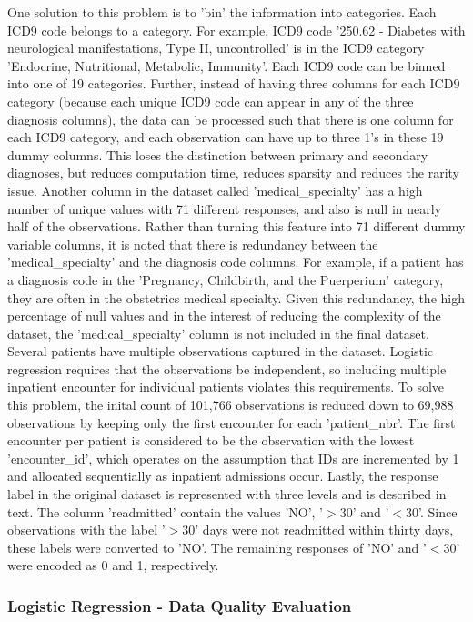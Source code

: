 \documentclass[sigconf]{acmart}
\begin{document}
One solution to this problem is to 'bin' the information into categories. Each ICD9 code belongs to a category. For example, ICD9 code '250.62 - Diabetes with neurological manifestations, Type II, uncontrolled' is in the ICD9 category 'Endocrine, Nutritional, Metabolic, Immunity'. Each ICD9 code can be binned into one of 19 categories. Further, instead of having three columns for each ICD9 category (because each unique ICD9 code can appear in any of the three diagnosis columns), the data can be processed such that there is one column for each ICD9 category, and each observation can have up to three 1's in these 19 dummy columns. This loses the distinction between primary and secondary diagnoses, but reduces computation time, reduces sparsity and reduces the rarity issue.
Another column in the dataset called 'medical\_specialty' has a high number of unique values with 71 different responses, and also is null in nearly half of the observations. Rather than turning this feature into 71 different dummy variable columns, it is noted that there is redundancy between the 'medical\_specialty' and the diagnosis code columns. For example, if a patient has a diagnosis code in the 'Pregnancy, Childbirth, and the Puerperium' category, they are often in the obstetrics medical specialty. Given this redundancy, the high percentage of null values and in the interest of reducing the complexity of the dataset, the 'medical\_specialty' column is not included in the final dataset.
Several patients have multiple observations captured in the dataset. Logistic regression requires that the observations be independent, so including multiple inpatient encounter for individual patients violates this requirements. To solve this problem, the inital count of 101,766 observations is reduced down to 69,988 observations by keeping only the first encounter for each 'patient\_nbr'. The first encounter per patient is considered to be the observation with the lowest 'encounter\_id', which operates on the assumption that IDs are incremented by 1 and allocated sequentially as inpatient admissions occur.
Lastly, the response label in the original dataset is represented with three levels and is described in text. The column 'readmitted' contain the values 'NO', '$>$30' and '$<$30'. Since observations with the label '$>$30' days were not readmitted within thirty days, these labels were converted to 'NO'. The remaining responses of 'NO' and '$<$30' were encoded as 0 and 1, respectively.

\subsubsection{Logistic Regression - Data Quality Evaluation}
\end{document}
